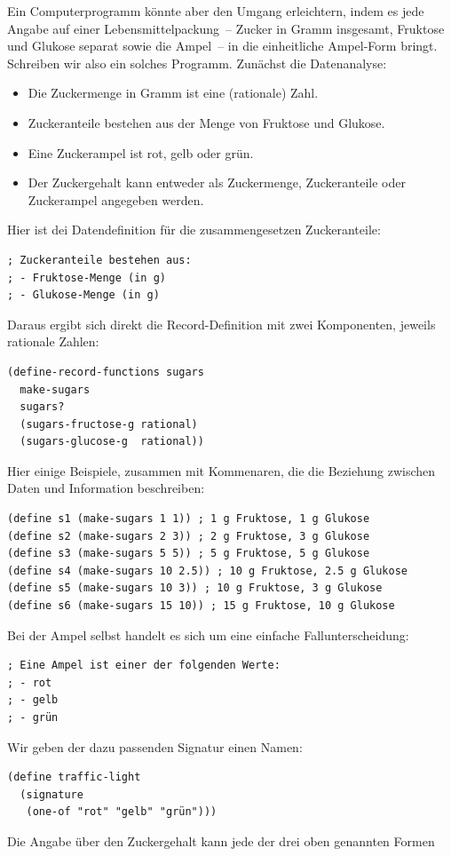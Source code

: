 Ein Computerprogramm könnte aber den Umgang erleichtern, indem es jede
Angabe auf einer Lebensmittelpackung~-- Zucker in Gramm insgesamt,
Fruktose und Glukose separat sowie die Ampel~-- in die einheitliche
Ampel-Form bringt.  Schreiben wir also ein solches Programm.  Zunächst
die Datenanalyse:
%
\begin{itemize}
\item Die Zuckermenge in Gramm ist eine (rationale) Zahl.
\item Zuckeranteile bestehen aus der Menge von Fruktose und Glukose.
\item Eine Zuckerampel ist rot, gelb oder grün.
\item Der Zuckergehalt kann entweder als Zuckermenge, Zuckeranteile
  oder Zuckerampel angegeben werden.
\end{itemize}
%
Hier ist dei Datendefinition für die zusammengesetzen Zuckeranteile:
%
\begin{verbatim}
; Zuckeranteile bestehen aus:
; - Fruktose-Menge (in g)
; - Glukose-Menge (in g)
\end{verbatim}
%
Daraus ergibt sich direkt die Record-Definition mit zwei Komponenten,
jeweils rationale Zahlen:
%
\begin{verbatim}
(define-record-functions sugars
  make-sugars
  sugars?
  (sugars-fructose-g rational)
  (sugars-glucose-g  rational))
\end{verbatim}
%
Hier einige Beispiele, zusammen mit Kommenaren, die die Beziehung
zwischen Daten und Information beschreiben:
%
\begin{verbatim}
(define s1 (make-sugars 1 1)) ; 1 g Fruktose, 1 g Glukose
(define s2 (make-sugars 2 3)) ; 2 g Fruktose, 3 g Glukose
(define s3 (make-sugars 5 5)) ; 5 g Fruktose, 5 g Glukose
(define s4 (make-sugars 10 2.5)) ; 10 g Fruktose, 2.5 g Glukose
(define s5 (make-sugars 10 3)) ; 10 g Fruktose, 3 g Glukose
(define s6 (make-sugars 15 10)) ; 15 g Fruktose, 10 g Glukose
\end{verbatim}
%
Bei der Ampel selbst handelt es sich um eine einfache
Fallunterscheidung:
%
\begin{verbatim}
; Eine Ampel ist einer der folgenden Werte:
; - rot
; - gelb
; - grün
\end{verbatim}
%
Wir geben der dazu passenden Signatur einen Namen:
%
\begin{verbatim}
(define traffic-light
  (signature
   (one-of "rot" "gelb" "grün")))
\end{verbatim}
%
Die Angabe über den Zuckergehalt kann jede der drei oben genannten Formen
